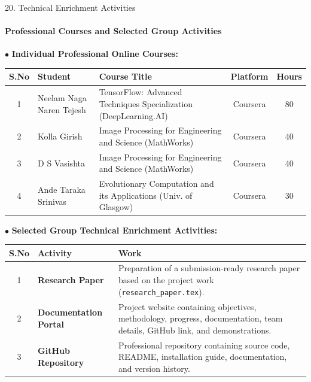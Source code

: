 \documentclass[aspectratio=169, 11pt]{beamer}
\begin{document}
\begin{frame}{20. Technical Enrichment Activities}
    \framesubtitle{Professional Courses and Selected Group Activities}
    \vspace{-0.2cm}
    
    {\textcolor{amritaMaroon}{$\bullet$} \textbf{\footnotesize Individual Professional Online Courses:}}
    \vspace{0.08cm}
    \begin{table}
        \centering
        \fontsize{6.5pt}{8pt}\selectfont
        \renewcommand{\arraystretch}{1.15}
        \begin{tabular}{|c|l|p{6.8cm}|c|c|}
            \hline
            \textbf{S.No} & \textbf{Student} & \textbf{Course Title} & \textbf{Platform} & \textbf{Hours} \\
            \hline
            1 & Neelam Naga Naren Tejesh & TensorFlow: Advanced Techniques Specialization (DeepLearning.AI) & Coursera & 80 \\
            \hline
            2 & Kolla Girish & Image Processing for Engineering and Science (MathWorks) & Coursera & 40 \\
            \hline
            3 & D S Vasishta & Image Processing for Engineering and Science (MathWorks) & Coursera & 40 \\
            \hline
            4 & Ande Taraka Srinivas & Evolutionary Computation and its Applications (Univ. of Glasgow) & Coursera & 30 \\
            \hline
        \end{tabular}
    \end{table}

    \vspace{0.12cm}
    {\textcolor{amritaMaroon}{$\bullet$} \textbf{\footnotesize Selected Group Technical Enrichment Activities:}}
    \vspace{0.08cm}
    \begin{table}
        \centering
        \fontsize{6.5pt}{8pt}\selectfont
        \renewcommand{\arraystretch}{1.15}
        \begin{tabular}{|c|l|p{9.8cm}|}
            \hline
            \textbf{S.No} & \textbf{Activity} & \textbf{Work} \\
            \hline
            1 & \textbf{Research Paper} & Preparation of a submission-ready research paper based on the project work (\texttt{research\_paper.tex}). \\
            \hline
            2 & \textbf{Documentation Portal} & Project website containing objectives, methodology, progress, documentation, team details, GitHub link, and demonstrations. \\
            \hline
            3 & \textbf{GitHub Repository} & Professional repository containing source code, README, installation guide, documentation, and version history. \\
            \hline
        \end{tabular}
    \end{table}
\end{frame}
\end{document}
